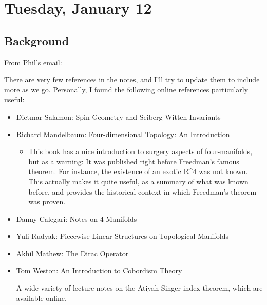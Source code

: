 \newpage

\tableofcontents
\newpage

\hypertarget{tuesday-january-12}{%
\section{Tuesday, January 12}\label{tuesday-january-12}}

\hypertarget{background}{%
\subsection{Background}\label{background}}

From Phil's email:

There are very few references in the notes, and I'll try to update them
to include more as we go. Personally, I found the following online
references particularly useful:

\begin{itemize}
\item
  Dietmar Salamon: Spin Geometry and Seiberg-Witten Invariants
  \autocite{Dietmar99}
\item
  Richard Mandelbaum: Four-dimensional Topology: An Introduction
  \autocite{Mandelbaum1980}

  \begin{itemize}
  \tightlist
  \item
    This book has a nice introduction to surgery aspects of
    four-manifolds, but as a warning: It was published right before
    Freedman's famous theorem. For instance, the existence of an exotic
    R\^{}4 was not known. This actually makes it quite useful, as a
    summary of what was known before, and provides the historical
    context in which Freedman's theorem was proven.
  \end{itemize}
\item
  Danny Calegari: Notes on 4-Manifolds \autocite{Calegari}
\item
  Yuli Rudyak: Piecewise Linear Structures on Topological Manifolds
  \autocite{Rudyak}
\item
  Akhil Mathew: The Dirac Operator \autocite{Matthew}
\item
  Tom Weston: An Introduction to Cobordism Theory \autocite{Weston}

  A wide variety of lecture notes on the Atiyah-Singer index theorem,
  which are available online.
\end{itemize}

